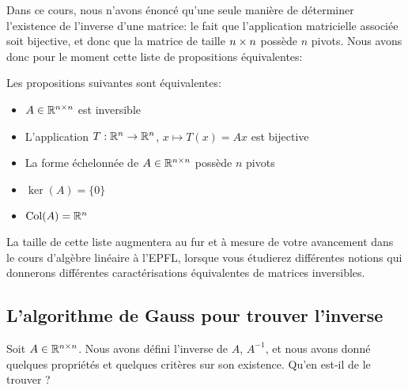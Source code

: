 \noindent Dans ce cours, nous n'avons énoncé qu'une seule manière de déterminer l'existence de l'inverse d'une matrice: le fait que l'application matricielle associée soit bijective, et donc que la matrice de taille $n \times n$ possède $n$ pivots. Nous avons donc pour le moment cette liste de propositions équivalentes:
\begin{boxthm}
Les propositions suivantes sont équivalentes:
\begin{itemize}
    \item $A \in \mathbb{R}^{n \times n}$ est inversible
    \item L'application $T: \mathbb{R}^n \to \mathbb{R}^n$, $x \mapsto T(x)=Ax$ est bijective
    \item La forme échelonnée de $A \in \mathbb{R}^{n \times n}$ possède $n$ pivots
    \item $\ker (A) = \{0\}$
    \item $\text{Col} (A) = \mathbb{R}^n$
\end{itemize}
\end{boxthm}
La taille de cette liste augmentera au fur et à mesure de votre avancement dans le cours d'algèbre linéaire à l'EPFL, lorsque vous étudierez différentes notions qui donnerons différentes caractérisations équivalentes de matrices inversibles. 

\subsection{L'algorithme de Gauss pour trouver l'inverse}
\noindent Soit $A \in \mathbb{R}^{n\times n}$. Nous avons défini l'inverse de $A$, $A^{-1}$, et nous avons donné quelques propriétés et quelques critères sur son existence. Qu'en est-il de le trouver ? \\

